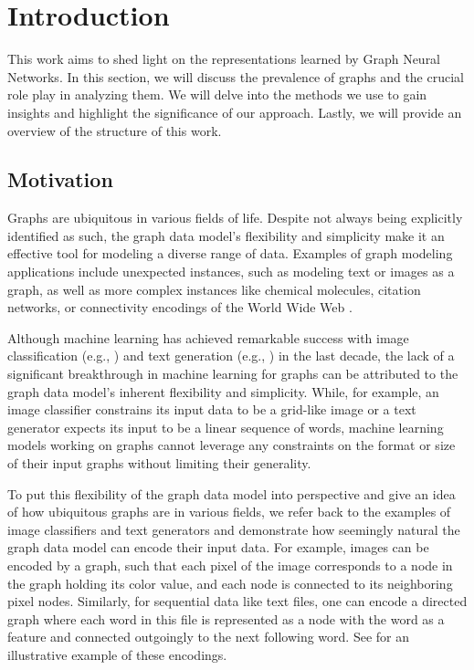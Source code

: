 \section{Introduction}
This work aims to shed light on the representations learned by \textsf{Graph Neural Networks}. In this section, we will discuss the prevalence of graphs and the crucial role \gnns play in analyzing them. We will delve into the methods we use to gain insights and highlight the significance of our approach. Lastly, we will provide an overview of the structure of this work.

\subsection{Motivation}
Graphs are ubiquitous in various fields of life. Despite not always being explicitly identified as such, the graph data model's flexibility and simplicity make it an effective tool for modeling a diverse range of data. Examples of graph modeling applications include unexpected instances, such as modeling text or images as a graph, as well as more complex instances like chemical molecules, citation networks, or connectivity encodings of the World Wide Web \cite{Mor+2020, Sca+2009}.

Although machine learning has achieved remarkable success with image classification (e.g., \cite{Zoph2018, He2016}) and text generation (e.g., \cite{Radford2019, Brown2020}) in the last decade, the lack of a significant breakthrough in machine learning for graphs can be attributed to the graph data model's inherent flexibility and simplicity. While, for example, an image classifier constrains its input data to be a grid-like image or a text generator expects its input to be a linear sequence of words, machine learning models working on graphs cannot leverage any constraints on the format or size of their input graphs without limiting their generality. 

To put this flexibility of the graph data model into perspective and give an idea of how ubiquitous graphs are in various fields, we refer back to the examples of image classifiers and text generators and demonstrate how seemingly natural the graph data model can encode their input data. For example, images can be encoded by a graph, such that each pixel of the image corresponds to a node in the graph holding its color value, and each node is connected to its neighboring pixel nodes. Similarly, for sequential data like text files, one can encode a directed graph where each word in this file is represented as a node with the word as a feature and connected outgoingly to the next following word. See  for an illustrative example of these encodings.

